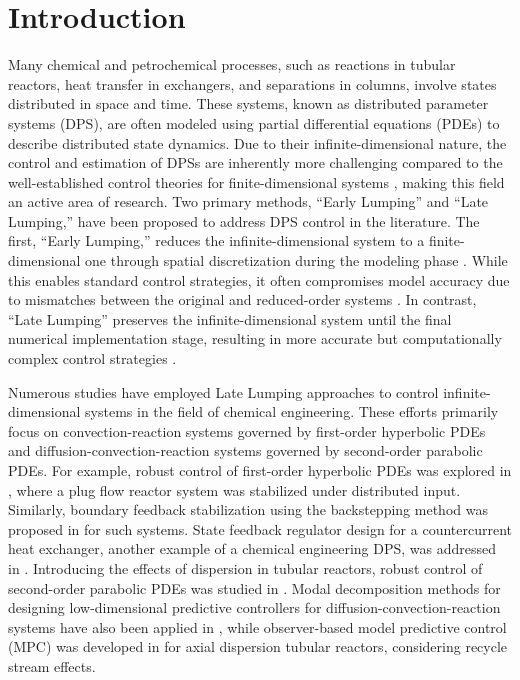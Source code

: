 \section{Introduction}

Many chemical and petrochemical processes, such as reactions in tubular reactors, heat transfer in exchangers, and separations in columns, involve states distributed in space and time. These systems, known as distributed parameter systems (DPS), are often modeled using partial differential equations (PDEs) to describe distributed state dynamics. Due to their infinite-dimensional nature, the control and estimation of DPSs are inherently more challenging compared to the well-established control theories for finite-dimensional systems \cite{ray1981advanced}, making this field an active area of research. Two primary methods, “Early Lumping” and “Late Lumping,” have been proposed to address DPS control in the literature. The first, “Early Lumping,” reduces the infinite-dimensional system to a finite-dimensional one through spatial discretization during the modeling phase \cite{davison1976robust}. While this enables standard control strategies, it often compromises model accuracy due to mismatches between the original and reduced-order systems \cite{moghadam2012infinite}. In contrast, “Late Lumping” preserves the infinite-dimensional system until the final numerical implementation stage, resulting in more accurate but computationally complex control strategies \cite{ray1981advanced}.

Numerous studies have employed Late Lumping approaches to control infinite-dimensional systems in the field of chemical engineering. These efforts primarily focus on convection-reaction systems governed by first-order hyperbolic PDEs and diffusion-convection-reaction systems governed by second-order parabolic PDEs. For example, robust control of first-order hyperbolic PDEs was explored in \cite{christofides1996feedback}, where a plug flow reactor system was stabilized under distributed input. Similarly, boundary feedback stabilization using the backstepping method was proposed in \cite{krstic2008backstepping} for such systems. State feedback regulator design for a countercurrent heat exchanger, another example of a chemical engineering DPS, was addressed in \cite{xu2016state}. Introducing the effects of dispersion in tubular reactors, robust control of second-order parabolic PDEs was studied in \cite{christofides1998robust}. Modal decomposition methods for designing low-dimensional predictive controllers for diffusion-convection-reaction systems have also been applied in \cite{dubljevic2006predictive2}, while observer-based model predictive control (MPC) was developed in \cite{khatibi2021model} for axial dispersion tubular reactors, considering recycle stream effects.


